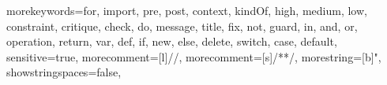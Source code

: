 {morekeywords={for, import, pre, post, context, kindOf, high, medium, low, constraint, critique, check, do, message, title, fix, not, guard, in, and, or, operation, return, var, def, if, new, else, delete, switch, case, default},
sensitive=true,
morecomment=[l]{//},
morecomment=[s]{/*}{*/},
morestring=[b]",
showstringspaces=false,
}
